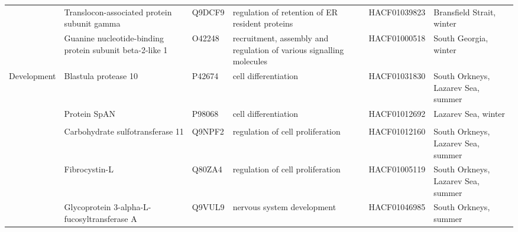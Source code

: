 {\begin{longtable}{@{}L{1.8cm}L{3cm}L{2cm}L{2.5cm}L{1.75cm}L{2.5cm}@{}}
                                       & Translocon-associated protein subunit gamma                             & Q9DCF9                                  & regulation of retention of ER resident proteins                                                      & HACF01039823       & Bransfield Strait, winter            \\
                                       & Guanine nucleotide-binding protein subunit beta-2-like 1                & O42248                                  & recruitment, assembly and regulation of various signalling molecules                                 & HACF01000518       & South Georgia, winter                \\* \midrule
Development                            & Blastula protease 10                                                    & P42674                                  & cell differentiation                                                                                 & HACF01031830       & South Orkneys, Lazarev Sea, summer   \\
                                       & Protein SpAN                                                            & P98068                                  & cell differentiation                                                                                 & HACF01012692       & Lazarev Sea, winter                  \\
                                       &                                                                         &                                         &                                                                                                      &                    &                                      \\
                                       & Carbohydrate sulfotransferase 11                                        & Q9NPF2                                  & regulation of cell proliferation                                                                     & HACF01012160       & South Orkneys, Lazarev Sea, summer   \\
                                       & Fibrocystin-L                                                           & Q80ZA4                                  & regulation of cell proliferation                                                                     & HACF01005119       & South Orkneys, Lazarev Sea, summer   \\
                                       & Glycoprotein 3-alpha-L-fucosyltransferase A                             & Q9VUL9                                  & nervous system development                                                                           & HACF01046985       & South Orkneys, summer                \\

\end{longtable}}
